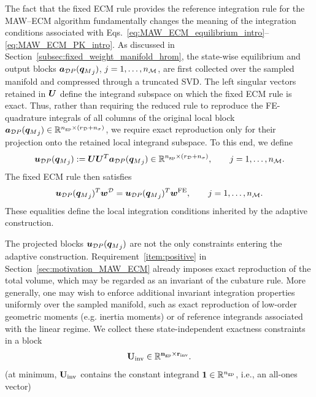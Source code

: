 \documentclass[11pt,a4paper]{article}
\begin{document}
The fact that the fixed ECM rule provides the reference integration rule for
the MAW--ECM algorithm fundamentally changes the meaning of the integration
conditions associated with
Eqs.~\eqref{eq:MAW_ECM_equilibrium_intro}--%
\eqref{eq:MAW_ECM_PK_intro}.    As discussed in
Section~\ref{subsec:fixed_weight_manifold_hrom}, the state-wise equilibrium
and output blocks \(\bm{a}_{\mathcal{D}P}({\bm{q}_M}_j)\), \(j=1,\ldots,n_{\mathcal{M}}\), are first collected
over the sampled manifold and compressed through a truncated SVD. The left
singular vectors retained in \(\bm{U}\) define the integrand subspace on which
the fixed ECM rule is exact. Thus, rather than requiring the reduced rule to reproduce the FE-quadrature
integrals of all columns of the original local block
\(\bm{a}_{\mathcal{D}P}({\bm{q}_M}_j)\in\mathbb{R}^{n_{\mathrm{gp}}\times(r_{\mathcal{D}}+n_{\sigma})}\), we require exact
reproduction only for their projection onto the retained local integrand
subspace. To this end, we define
\begin{equation}
\label{eq:MAW_projected_local_block}
    \bm{u}_{\mathcal{D}P}({\bm{q}_M}_j)
    :=
    \bm{U}\bm{U}^T\bm{a}_{\mathcal{D}P}({\bm{q}_M}_j)
    \in
    \mathbb{R}^{n_{\mathrm{gp}}\times (r_{\mathcal{D}}+n_{\sigma})},
    \qquad
    j=1,\ldots,n_{\mathcal{M}} .
\end{equation}
The fixed ECM rule then satisfies
\begin{equation}
\label{eq:MAW_fixed_rule_local_exactness}
    \bm{u}_{\mathcal{D}P}({\bm{q}_M}_j)^T\bm{w}^{\mathcal{D}}
    =
    \bm{u}_{\mathcal{D}P}({\bm{q}_M}_j)^T\bm{w}^{\mathrm{FE}},
    \qquad
    j=1,\ldots,n_{\mathcal{M}} .
\end{equation}
These equalities define the local integration conditions inherited by the
adaptive construction.


The projected blocks \(\bm{u}_{\mathcal{D}P}({\bm{q}_M}_j)\) are not the only constraints entering
the adaptive construction. Requirement~\ref{item:positive} in
Section~\ref{sec:motivation_MAW_ECM} already imposes exact reproduction of the
total volume, which may be regarded as an   invariant of the
cubature rule. More generally, one may wish to enforce additional invariant
integration properties uniformly over the sampled manifold, such as exact reproduction of low-order geometric moments (e.g. inertia moments) or of reference integrands associated with the
 linear regime.      We collect these state-independent exactness constraints in a block
\begin{equation}
\label{eq:invariants1}
    \bf{U}_{\mathrm{inv}}\in\mathbb{R}^{n_{\mathrm{gp}}\times r_{\mathrm{inv}}}.
\end{equation}
(at minimum, \(\bf{U}_{\mathrm{inv}}\) contains the constant integrand
\(\bm{1}\in\mathbb{R}^{n_{\mathrm{gp}}}\), i.e., an all-ones vector)
\end{document}
